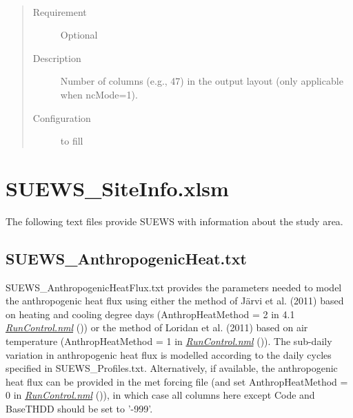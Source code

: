 \documentclass[letterpaper,10pt,english]{sphinxmanual}
\begin{document}

\begin{fulllineitems}
\label{\detokenize{input_files/RunControl/netCDF_related_options:cmdoption-arg-ncol}}~\begin{quote}\begin{description}
\item[{Requirement}] \leavevmode
Optional

\item[{Description}] \leavevmode
Number of columns (e.g., 47) in the output layout (only applicable when ncMode=1).

\item[{Configuration}] \leavevmode
to fill

\end{description}\end{quote}

\end{fulllineitems}



\section{SUEWS\_SiteInfo.xlsm}
\label{\detokenize{input_files/SUEWS_SiteInfo/SUEWS_SiteInfo::doc}}\label{\detokenize{input_files/SUEWS_SiteInfo/SUEWS_SiteInfo:suews-siteinfo-xlsm}}
The following text files provide SUEWS with information about the study
area.


\subsection{SUEWS\_AnthropogenicHeat.txt}
\label{\detokenize{input_files/SUEWS_SiteInfo/SUEWS_AnthropogenicHeat::doc}}\label{\detokenize{input_files/SUEWS_SiteInfo/SUEWS_AnthropogenicHeat:suews-anthropogenicheat-txt}}
SUEWS\_AnthropogenicHeatFlux.txt provides the parameters needed to model
the anthropogenic heat flux using either the method of Järvi et al.
(2011) based on heating and cooling degree days (AnthropHeatMethod = 2
in 4.1 {\hyperref[\detokenize{input_files/SUEWS_SiteInfo/SUEWS_AnthropogenicHeat:RunControl.nml}]{\emph{RunControl.nml}}} ()) or the method of Loridan et
al. (2011) based on air temperature (AnthropHeatMethod = 1 in
{\hyperref[\detokenize{input_files/SUEWS_SiteInfo/SUEWS_AnthropogenicHeat:RunControl.nml}]{\emph{RunControl.nml}}} ()). The sub-daily variation in
anthropogenic heat flux is modelled according to the daily cycles
specified in SUEWS\_Profiles.txt. Alternatively, if available, the
anthropogenic heat flux can be provided in the met forcing file (and set
AnthropHeatMethod = 0 in {\hyperref[\detokenize{input_files/SUEWS_SiteInfo/SUEWS_AnthropogenicHeat:RunControl.nml}]{\emph{RunControl.nml}}} ()), in which
case all columns here except Code and BaseTHDD should be set to ’-999’.
\end{document}
